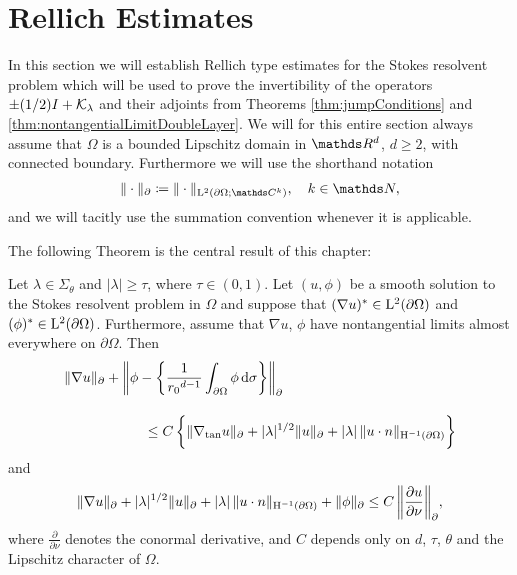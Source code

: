 \chapter{Rellich Estimates}
\label{chap:4}

In this section we will establish Rellich type estimates for the Stokes resolvent problem which will be used to prove the invertibility of the operators $\pm(1/2)I + \mathcal{K}_{\lambda}$ and their adjoints from Theorems  \ref{thm:jumpConditions} and \ref{thm:nontangentialLimitDoubleLayer}.
We will for this entire section always assume that $\Omega$ is a bounded Lipschitz domain in $\R^d$, $d \geq 2$, with connected boundary.
Furthermore we will use the shorthand notation
\begin{align*}
  \| \cdot \|_{\partial} \coloneqq \| \cdot \|_{\Ell^2(\partial\Omega; \C^k)}, \quad k \in \N,
\end{align*}
and we will tacitly use the summation convention whenever it is applicable.

The following Theorem is the central result of this chapter:

\begin{thm}
  \label{thm:rellich}
  Let $\lambda \in \Sigma_\theta$ and $|\lambda| \geq \tau$, where 
  $\tau \in (0,1)$.
  Let $(u,\phi)$ be a smooth solution to the Stokes resolvent problem in $\Omega$ and suppose that $(\nabla u)^* \in \mathrm{L}^2(\partial\Omega)$ and $(\phi)^* \in \mathrm{L}^2(\partial\Omega)$.
  Furthermore, assume that $\nabla u$, $\phi$ have nontangential limits almost everywhere on $\partial\Omega$.
  Then
  \begin{align}
    \label{eq:rellich1}
    \begin{alignedat}{1}
      &\|\nabla u\|_\partial + \bigg\|\phi - \bigg\{ \frac{1}{{r_0}^{d - 1}}\int_{\partial\Omega} \phi \, {\operatorname{d}\!{\sigma}} \bigg\} \bigg\|_\partial \\[1em]
      &\hspace{2cm} \leq C\, \bigg\{ \|\nabla_{\mathrm{tan}} u\|_\partial + |\lambda|^{1/2} \|u\|_\partial + |\lambda| \, \|u \cdot n\|_{\mathrm{H}^{-1}(\partial\Omega)} \bigg\}
    \end{alignedat}
  \end{align}
  and
  \begin{align}
    \label{eq:rellich2}
    \|\nabla u\|_\partial + |\lambda|^{1/2} \|u\|_\partial + |\lambda| \, \|u \cdot n\|_{\mathrm{H}^{-1}(\partial\Omega)} + \|\phi\|_\partial
    \leq C \, \bigg\|\frac{\partial u}{\partial \nu} \bigg\|_\partial,
  \end{align}
  where $\frac{\partial}{\partial \nu}$ denotes the conormal derivative, and $C$ depends only on $d$, $\tau$, $\theta$ and the Lipschitz character of $\Omega$.
\end{thm}

